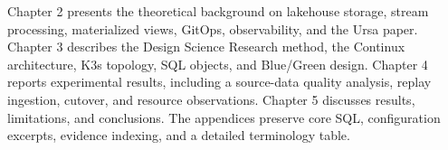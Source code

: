 Chapter 2 presents the theoretical background on lakehouse storage, stream processing, materialized views, GitOps, observability, and the Ursa paper. Chapter 3 describes the Design Science Research method, the Continux architecture, K3s topology, SQL objects, and Blue/Green design. Chapter 4 reports experimental results, including a source-data quality analysis, replay ingestion, cutover, and resource observations. Chapter 5 discusses results, limitations, and conclusions. The appendices preserve core SQL, configuration excerpts, evidence indexing, and a detailed terminology table.
